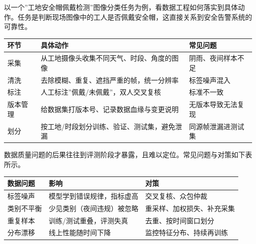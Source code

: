 \documentclass[12pt,a4paper,twoside,openany]{ctexbook}
\numberwithin{figure}{chapter}
\numberwithin{table}{chapter}
\newcounter{none}
\begin{document}
以一个''工地安全帽佩戴检测''图像分类任务为例，看数据工程如何落实到具体动作。任务是判断现场图像中的工人是否佩戴安全帽，这直接关系到安全告警系统的可靠性。

{\def\LTcaptype{none} %
\begin{longtable}[]{@{}
  >{\raggedright\arraybackslash}p{}
  >{\raggedright\arraybackslash}p{}
  >{\raggedright\arraybackslash}p{}@{}}
\toprule\noalign{}
\begin{minipage}[b]{\linewidth}\raggedright
环节
\end{minipage} & \begin{minipage}[b]{\linewidth}\raggedright
具体动作
\end{minipage} & \begin{minipage}[b]{\linewidth}\raggedright
常见问题
\end{minipage} \\
\midrule\noalign{}
\endhead
\bottomrule\noalign{}
\endlastfoot
采集 & 从工地摄像头收集不同天气、时段、角度的图像 &
阴雨、夜间样本不足 \\
清洗 & 去除模糊、重复、遮挡严重的帧，统一分辨率 & 标签噪声混入 \\
标注 & 人工标注''佩戴/未佩戴''，双人交叉复核 & 标准不一致 \\
版本管理 & 给数据集打版本号、记录数据血缘与变更说明 &
无版本导致无法复现 \\
划分 & 按工地/时段划分训练、验证、测试集，避免泄漏 &
同源帧泄漏进测试集 \\
\end{longtable}
}

数据质量问题的后果往往到评测阶段才暴露，且难以定位。常见问题与对策如下表所示。

{\def\LTcaptype{none} %
\begin{longtable}[]{@{}lll@{}}
\toprule\noalign{}
数据问题 & 影响 & 对策 \\
\midrule\noalign{}
\endhead
\bottomrule\noalign{}
\endlastfoot
标签噪声 & 模型学到错误规律，指标虚高 & 交叉复核、众包仲裁 \\
类别不平衡 & 少见类别（夜间违规）被忽略 & 重采样、加权损失、补充采集 \\
重复样本 & 训练/测试重叠，评测失真 & 去重、按时间窗口划分 \\
分布漂移 & 线上性能随时间下降 & 监控特征分布、持续再训练 \\
\end{longtable}
}
\end{document}
